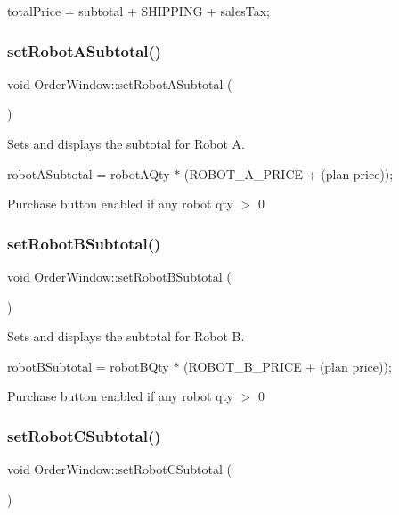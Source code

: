 total\+Price = subtotal + S\+H\+I\+P\+P\+I\+NG + sales\+Tax; \mbox{\label{class_order_window_a4fec739fb9e3c2c06fdf8afa7d94a4f9}} 
\subsubsection{\texorpdfstring{setRobotASubtotal()}{setRobotASubtotal()}}
{\footnotesize\ttfamily void Order\+Window\+::set\+Robot\+A\+Subtotal (\begin{DoxyParamCaption}{ }\end{DoxyParamCaption})}



Sets and displays the subtotal for Robot A. 

robot\+A\+Subtotal = robot\+A\+Qty $\ast$ (R\+O\+B\+O\+T\+\_\+\+A\+\_\+\+P\+R\+I\+CE + (plan price));

Purchase button enabled if any robot qty $>$ 0 \mbox{\label{class_order_window_aa575a53f391f6bc103e89f2bf2fce91e}} 
\subsubsection{\texorpdfstring{setRobotBSubtotal()}{setRobotBSubtotal()}}
{\footnotesize\ttfamily void Order\+Window\+::set\+Robot\+B\+Subtotal (\begin{DoxyParamCaption}{ }\end{DoxyParamCaption})}



Sets and displays the subtotal for Robot B. 

robot\+B\+Subtotal = robot\+B\+Qty $\ast$ (R\+O\+B\+O\+T\+\_\+\+B\+\_\+\+P\+R\+I\+CE + (plan price));

Purchase button enabled if any robot qty $>$ 0 \mbox{\label{class_order_window_a5283f60b1a3076038b08160b37542fdc}} 
\subsubsection{\texorpdfstring{setRobotCSubtotal()}{setRobotCSubtotal()}}
{\footnotesize\ttfamily void Order\+Window\+::set\+Robot\+C\+Subtotal (\begin{DoxyParamCaption}{ }\end{DoxyParamCaption})}



